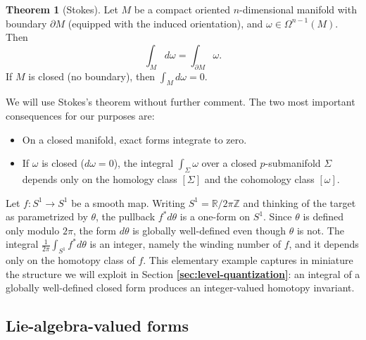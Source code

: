 \documentclass[11pt]{article}
\newcommand{\Z}{\mathbb{Z}}
\newcommand{\R}{\mathbb{R}}
\theoremstyle{definition}
\newtheorem{theorem}[equation]{Theorem}
\numberwithin{theorem}{section}
\numberwithin{equation}{section}
\let\del\partial
\begin{document}
\begin{theorem}[Stokes]\label{thm:stokes}
Let $M$ be a compact oriented $n$-dimensional manifold with boundary $\del M$ (equipped with the induced orientation), and $\omega \in \Omega^{n-1}(M)$. Then
\begin{equation}\label{eq:stokes}
\int_M d\omega = \int_{\del M} \omega.
\end{equation}
If $M$ is closed (no boundary), then $\int_M d\omega = 0$.
\end{theorem}

\noindent We will use Stokes's theorem without further comment. The two most important consequences for our purposes are:
\begin{itemize}
\item On a closed manifold, exact forms integrate to zero.
\item If $\omega$ is closed ($d\omega=0$), the integral $\int_\Sigma \omega$ over a closed $p$-submanifold $\Sigma$ depends only on the homology class $[\Sigma]$ and the cohomology class $[\omega]$.
\end{itemize}

\begin{example}\label{ex:winding}
Let $f:S^1\to S^1$ be a smooth map. Writing $S^1 = \R/2\pi\Z$ and thinking of the target as parametrized by $\theta$, the pullback $f^*d\theta$ is a one-form on $S^1$. Since $\theta$ is defined only modulo $2\pi$, the form $d\theta$ is globally well-defined even though $\theta$ is not. The integral $\frac{1}{2\pi}\int_{S^1}f^*d\theta$ is an integer, namely the winding number of $f$, and it depends only on the homotopy class of $f$. This elementary example captures in miniature the structure we will exploit in Section \textbf{\ref{sec:level-quantization}}: an integral of a globally well-defined closed form produces an integer-valued homotopy invariant.
\end{example}

\subsection{Lie-algebra-valued forms}
\end{document}
